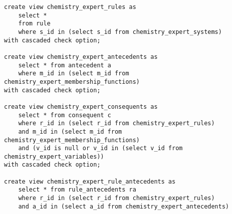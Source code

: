 \begin{lstlisting}[caption=Создание ролей на уровне базы данных (часть 2)]
create view chemistry_expert_rules as
	select *
	from rule
	where s_id in (select s_id from chemistry_expert_systems)
with cascaded check option;

create view chemistry_expert_antecedents as
	select * from antecedent a 
	where m_id in (select m_id from chemistry_expert_membership_functions)
with cascaded check option;

create view chemistry_expert_consequents as
	select * from consequent c 
	where r_id in (select r_id from chemistry_expert_rules) 
	and m_id in (select m_id from chemistry_expert_membership_functions)
	and (v_id is null or v_id in (select v_id from chemistry_expert_variables))
with cascaded check option;

create view chemistry_expert_rule_antecedents as
	select * from rule_antecedents ra 
	where r_id in (select r_id from chemistry_expert_rules)
	and a_id in (select a_id from chemistry_expert_antecedents)
\end{lstlisting}
